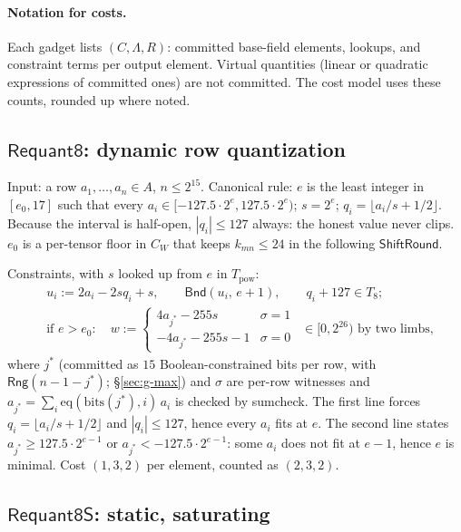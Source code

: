 \documentclass[11pt]{article}
\newcommand{\Rng}{\mathsf{Rng}}
\newcommand{\Bnd}{\mathsf{Bnd}}
\begin{document}
\paragraph{Notation for costs.}
Each gadget lists \((C, \Lambda, R)\): committed base-field elements, lookups, and constraint terms per output element.
Virtual quantities (linear or quadratic expressions of committed ones) are not committed.
The cost model uses these counts, rounded up where noted.

\subsection{\texorpdfstring{\(\mathsf{Requant8}\)}{Requant8}: dynamic row quantization}
\label{sec:g-req}

Input: a row \(a_1,\ldots,a_n \in A\), \(n \le 2^{15}\).
Canonical rule: \(e\) is the least integer in \([e_0, 17]\) such that every \(a_i \in [-127.5\cdot 2^e, 127.5 \cdot 2^e)\); \(s = 2^e\); \(q_i = \lfloor a_i/s + 1/2 \rfloor\).
Because the interval is half-open, \(|q_i| \le 127\) always: the honest value never clips.
\(e_0\) is a per-tensor floor in \(C_W\) that keeps \(k_{mn} \le 24\) in the following \(\mathsf{ShiftRound}\).

Constraints, with \(s\) looked up from \(e\) in \(T_{\mathrm{pow}}\):
\begin{align*}
&u_i := 2a_i - 2 s q_i + s, \qquad \Bnd(u_i,\, e+1), \qquad q_i + 127 \in T_8; \\
&\text{if } e > e_0:\quad w := \begin{cases} 4 a_{j^\ast} - 255 s & \sigma = 1\\ -4 a_{j^\ast} - 255 s - 1 & \sigma = 0\end{cases}\ \ \in [0, 2^{26}) \text{ by two limbs},
\end{align*}
where \(j^\ast\) (committed as \(15\) Boolean-constrained bits per row, with \(\Rng(n - 1 - j^\ast)\); \S\ref{sec:g-max}) and \(\sigma\) are per-row witnesses and \(a_{j^\ast} = \sum_i \mathrm{eq}(\mathrm{bits}(j^\ast), i)\, a_i\) is checked by sumcheck.
The first line forces \(q_i = \lfloor a_i/s + 1/2\rfloor\) and \(|q_i| \le 127\), hence every \(a_i\) fits at \(e\).
The second line states \(a_{j^\ast} \ge 127.5 \cdot 2^{e-1}\) or \(a_{j^\ast} < -127.5 \cdot 2^{e-1}\): some \(a_i\) does not fit at \(e-1\), hence \(e\) is minimal.
Cost \((1, 3, 2)\) per element, counted as \((2,3,2)\).

\subsection{\texorpdfstring{\(\mathsf{Requant8S}\)}{Requant8S}: static, saturating}
\label{sec:g-reqs}
\end{document}
